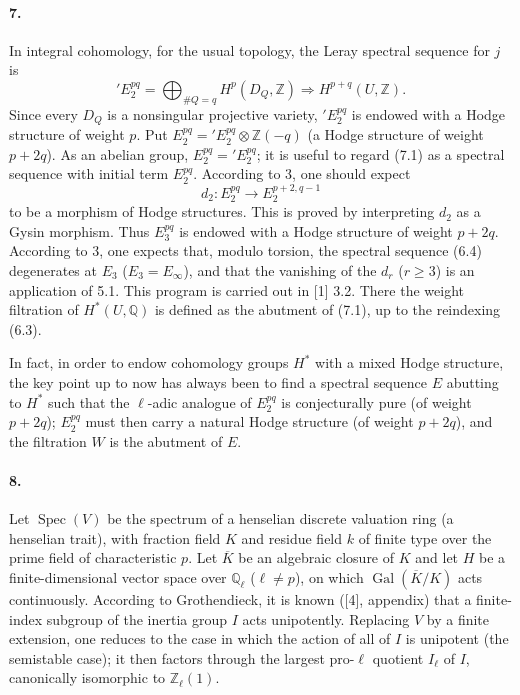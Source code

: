 \documentclass[10pt]{article}
\newcommand{\Q}{\mathbb Q}
\newcommand{\Z}{\mathbb Z}
\newcommand{\Ql}{\mathbb Q_\ell}
\newcommand{\Zl}{\mathbb Z_\ell}
\newcommand{\Gal}{\operatorname{Gal}}
\newcommand{\Spec}{\operatorname{Spec}}
\newcommand{\barK}{\overline{K}}
\begin{document}
\paragraph{7.} In integral cohomology, for the usual topology, the Leray spectral sequence for $j$ is
\[
\tag{7.1}
{}'E_2^{pq}=\bigoplus_{\#Q=q}H^p(D_Q,\Z)\Rightarrow H^{p+q}(U,\Z).
\]
Since every $D_Q$ is a nonsingular projective variety, ${}'E_2^{pq}$ is endowed with a Hodge structure of weight $p$. Put $E_2^{pq}={}'E_2^{pq}\otimes\Z(-q)$ (a Hodge structure of weight $p+2q$). As an abelian group, $E_2^{pq}={}'E_2^{pq}$; it is useful to regard (7.1) as a spectral sequence with initial term $E_2^{pq}$. According to 3, one should expect
\[
d_2:E_2^{pq}\to E_2^{p+2,q-1}
\]
to be a morphism of Hodge structures. This is proved by interpreting $d_2$ as a Gysin morphism. Thus $E_3^{pq}$ is endowed with a Hodge structure of weight $p+2q$. According to 3, one expects that, modulo torsion, the spectral sequence (6.4) degenerates at $E_3$ ($E_3=E_\infty$), and that the vanishing of the $d_r$ ($r\ge3$) is an application of 5.1. This program is carried out in [1] 3.2. There the weight filtration of $H^*(U,\Q)$ is defined as the abutment of (7.1), up to the reindexing (6.3).

In fact, in order to endow cohomology groups $H^*$ with a mixed Hodge structure, the key point up to now has always been to find a spectral sequence $E$ abutting to $H^*$ such that the $\ell$-adic analogue of $E_2^{pq}$ is conjecturally pure (of weight $p+2q$); $E_2^{pq}$ must then carry a natural Hodge structure (of weight $p+2q$), and the filtration $W$ is the abutment of $E$.

\paragraph{8.} Let $\Spec(V)$ be the spectrum of a henselian discrete valuation ring (a henselian trait), with fraction field $K$ and residue field $k$ of finite type over the prime field of characteristic $p$. Let $\barK$ be an algebraic closure of $K$ and let $H$ be a finite-dimensional vector space over $\Ql$ ($\ell\ne p$), on which $\Gal(\barK/K)$ acts continuously. According to Grothendieck, it is known ([4], appendix) that a finite-index subgroup of the inertia group $I$ acts unipotently. Replacing $V$ by a finite extension, one reduces to the case in which the action of all of $I$ is unipotent (the semistable case); it then factors through the largest pro-$\ell$ quotient $I_\ell$ of $I$, canonically isomorphic to $\Zl(1)$.
\end{document}
